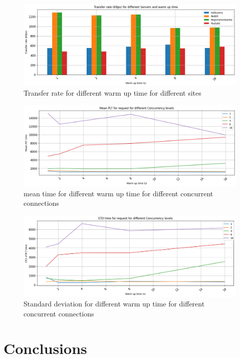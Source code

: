 \documentclass[eng]{class}
\begin{document}
\begin{figure}[H]
  \centering
  \includegraphics[width=\columnwidth]{images/transf_rate_diff_warm_up.png}
  \caption{Transfer rate for different warm up time for different sites}
  \label{fig-6}
\end{figure}

\begin{figure}[H]
  \centering
  \includegraphics[width=\columnwidth]{images/mean_time_warm_up.png}
  \caption{mean time for different warm up time for different concurrent connections}
  \label{fig-7}
\end{figure}

\begin{figure}[H]
  \centering
  \includegraphics[width=\columnwidth]{images/var_warm_up.png}
  \caption{Standard deviation for different warm up time for different concurrent connections}
  \label{fig-8}
\end{figure}

\section{Conclusions}
\end{document}
